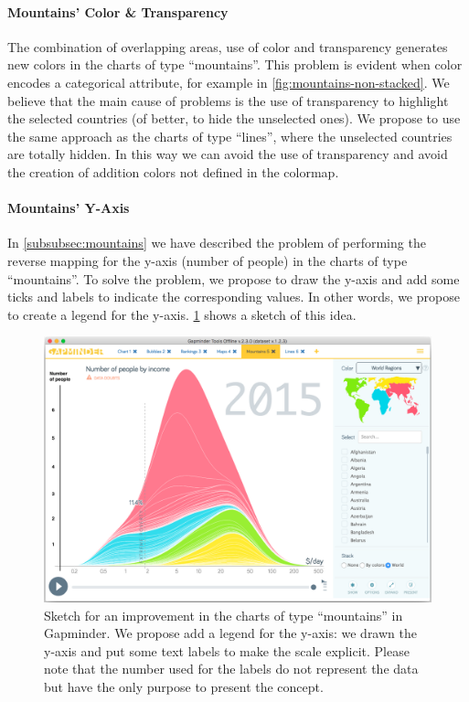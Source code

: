 \paragraph{Mountains' Color \& Transparency}
The combination of overlapping areas, use of color and transparency generates new colors in the charts of type ``mountains''.
This problem is evident when color encodes a categorical attribute, for example in \cref{fig:mountains-non-stacked}.
We believe that the main cause of problems is the use of transparency to highlight the selected countries (of better, to hide the unselected ones).
We propose to use the same approach as the charts of type ``lines'', where the unselected countries are totally hidden.
In this way we can avoid the use of transparency and avoid the creation of addition colors not defined in the colormap.

\paragraph{Mountains' Y-Axis}
In \cref{subsubsec:mountains} we have described the problem of performing the reverse mapping for the y-axis (number of people) in the charts of type ``mountains''.
To solve the problem, we propose to draw the y-axis and add some ticks and labels to indicate the corresponding values.
In other words, we propose to create a legend for the y-axis.
\cref{fig:mountains-y-legend} shows a sketch of this idea.

\begin{figure}[h]
	\centering
	\includegraphics[width=0.95\columnwidth]{figures/mountains-y-legend}
	\caption{Sketch for an improvement in the charts of type ``mountains'' in Gapminder. We propose add a legend for the y-axis: we drawn the y-axis and put some text labels to make the scale explicit. Please note that the number used for the labels do not represent the data but have the only purpose to present the concept.}
	\label{fig:mountains-y-legend}
\end{figure}

